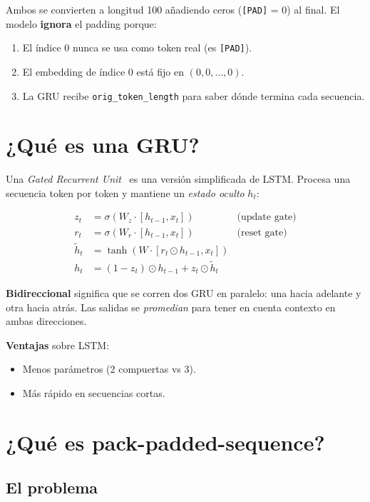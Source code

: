 \noindent Ambos se convierten a longitud 100 añadiendo ceros
(\texttt{[PAD]} = 0) al final. El modelo \textbf{ignora} el padding
porque:

\begin{enumerate}
  \item El índice 0 nunca se usa como token real (es
        \texttt{[PAD]}).
  \item El embedding de índice 0 está fijo en $(0, 0, \ldots, 0)$.
  \item La GRU recibe \texttt{orig\_token\_length} para saber
        dónde termina cada secuencia.
\end{enumerate}

\section{¿Qué es una GRU?}

Una \emph{Gated Recurrent Unit}~\cite{cho2014gru} es una versión
simplificada de LSTM. Procesa una secuencia token por token y
mantiene un \emph{estado oculto} $h_t$:

\begin{align}
  z_t &= \sigma(W_z \cdot [h_{t-1}, x_t])  &\text{(update gate)} \\
  r_t &= \sigma(W_r \cdot [h_{t-1}, x_t])  &\text{(reset gate)} \\
  \tilde{h}_t &= \tanh(W \cdot [r_t \odot h_{t-1}, x_t]) \\
  h_t &= (1 - z_t) \odot h_{t-1} + z_t \odot \tilde{h}_t
\end{align}

\noindent\textbf{Bidireccional} significa que se corren dos GRU en
paralelo: una hacia adelante y otra hacia atrás. Las salidas se
\emph{promedian} para tener en cuenta contexto en ambas
direcciones.

\noindent\textbf{Ventajas} sobre LSTM:
\begin{itemize}
  \item Menos parámetros (2 compuertas vs 3).
  \item Más rápido en secuencias cortas.
\end{itemize}

\section{¿Qué es pack-padded-sequence?}

\subsection{El problema}

